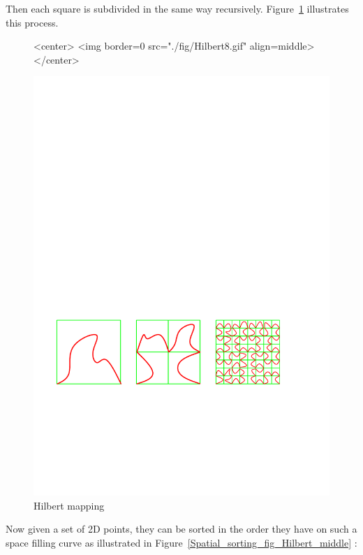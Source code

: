 Then each square is subdivided in the same way recursively.
Figure~\ref{Spatial_sorting_fig_Hilbert8} illustrates this process.

\begin{figure}
\begin{ccHtmlOnly}
<center>
<img border=0 src="./fig/Hilbert8.gif" align=middle>
</center>
\end{ccHtmlOnly} 
\begin{ccTexOnly}
\begin{center}
\includegraphics[width=11.5cm]{Spatial_sorting/fig/Hilbert8}
\end{center}
\end{ccTexOnly}
\caption{Hilbert mapping
\label{Spatial_sorting_fig_Hilbert8}}
\end{figure}

Now given a set of 2D points, they can be sorted in the order they have on such
a space filling curve as illustrated in Figure~\ref{Spatial_sorting_fig_Hilbert_middle} :

